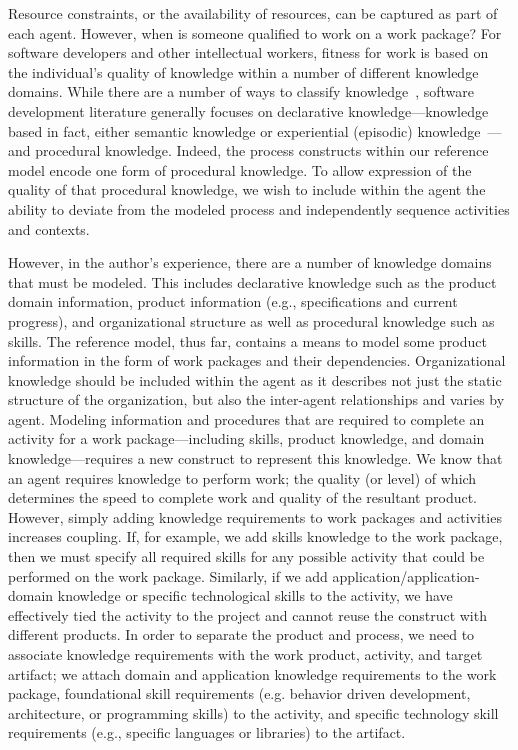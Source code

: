 Resource constraints, or the availability of resources, can be captured as part
of each agent.  However, when is someone qualified to work on a work package?
For software developers and other intellectual workers, fitness for work is
based on the individual's quality of knowledge within a number of different
knowledge domains.  While there are a number of ways to classify
knowledge~\cite{gorman_types_2002, robillard_role_1999}, software development
literature generally focuses on declarative knowledge---knowledge based in fact,
either semantic knowledge or experiential (episodic)
knowledge~\cite{robillard_role_1999}---and procedural knowledge.  Indeed, the
process constructs within our reference model encode one form of procedural
knowledge.  To allow expression of the quality of that procedural knowledge, we
wish to include within the agent the ability to deviate from the modeled process
and independently sequence activities and contexts.

However, in the author's experience, there are a number of knowledge domains
that must be modeled.  This includes declarative knowledge such as the product
domain information, product information (e.g., specifications and current
progress), and organizational structure as well as procedural knowledge such as
skills.  The reference model, thus far, contains a means to model some product
information in the form of work packages and their dependencies.  Organizational
knowledge should be included within the agent as it describes not just the
static structure of the organization, but also the inter-agent relationships and
varies by agent.  Modeling information and procedures that are required to
complete an activity for a work package---including skills, product knowledge,
and domain knowledge---requires a new construct to represent this knowledge.  We
know that an agent requires knowledge to perform work; the quality (or level) of
which determines the speed to complete work and quality of the resultant
product.  However, simply adding knowledge requirements to work packages and
activities increases coupling.  If, for example, we add skills knowledge to the
work package, then we must specify all required skills for any possible activity
that could be performed on the work package.  Similarly, if we add
application/application-domain knowledge or specific technological skills to the
activity, we have effectively tied the activity to the project and cannot reuse
the construct with different products.  In order to separate the product and
process, we need to associate knowledge requirements with the work product,
activity, and target artifact; we attach domain and application knowledge
requirements to the work package, foundational skill requirements (e.g. behavior
driven development, architecture, or programming skills) to the activity, and
specific technology skill requirements (e.g., specific languages or libraries)
to the artifact.  

